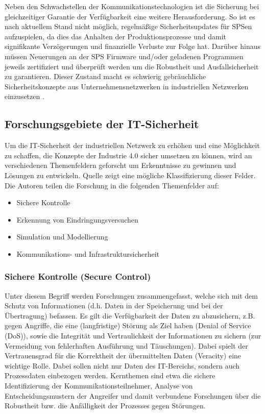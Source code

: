 Neben den Schwachstellen der Kommunikationstechnologien ist die Sicherung bei gleichzeitiger Garantie der Verfügbarkeit eine weitere Herausforderung. 
So ist es nach aktuellem Stand nicht möglich, regelmäßige Sicherheitsupdates für SPSen aufzuspielen, da dies das Anhalten der Produktionsprozesse und damit signifikante Verzögerungen und finanzielle Verluste zur Folge hat. Darüber hinaus müssen Neuerungen an der SPS Firmware und/oder geladenen Programmen jeweils zertifiziert und überprüft werden um die Robustheit und Ausfallsicherheit zu garantieren. Dieser Zustand macht es schwierig gebräuchliche Sicherheitskonzepte aus Unternehmensnetzwerken in industriellen Netzwerken einzusetzen \citep{6622964}.


\subsection{Forschungsgebiete der IT-Sicherheit}
Um die IT-Sicherheit der industriellen Netzwerk zu erhöhen und eine Möglichkeit zu schaffen, die Konzepte der Industrie 4.0 sicher umsetzen zu können, wird an verschiedenen Themenfeldern geforscht um Erkenntnisse zu gewinnen und Lösungen zu entwickeln. Quelle \citep{6622964} zeigt eine mögliche Klassifizierung dieser Felder. Die Autoren teilen die Forschung in die folgenden Themenfelder auf:
\begin{itemize}
\item Sichere Kontrolle
\item Erkennung von Eindringungsversuchen
\item Simulation und Modellierung
\item Kommunikations- und Infrastruktursicherheit
\end{itemize}

\subsubsection{Sichere Kontrolle (\glqq Secure Control\grqq  )} 
Unter diesem Begriff werden Forschungen zusammengefasst, welche sich mit dem Schutz von Informationen (d.h. Daten in der Speicherung und bei der Übertragung) befassen. Es gilt die Verfügbarkeit der Daten zu abzusichern, z.B. gegen Angriffe, die eine (langfristige) Störung als Ziel haben (Denial of Service (DoS)), sowie die Integrität und Vertraulichkeit der Informationen zu sichern (zur Vermeidung von fehlerhaften Ausführung und Täuschungen). Dabei spielt der Vertrauensgrad für die Korrektheit der übermittelten Daten (\glqq Veracity\grqq  ) eine wichtige Rolle. Dabei sollen nicht nur Daten des IT-Bereichs, sondern auch Prozessdaten einbezogen werden. Kernthemen sind etwa die sichere Identifizierung der Kommunikationsteilnehmer, Analyse von Entscheidungsmustern der Angreifer und damit verbundene Forschungen über die Robustheit bzw. die Anfälligkeit der Prozesses gegen Störungen.

